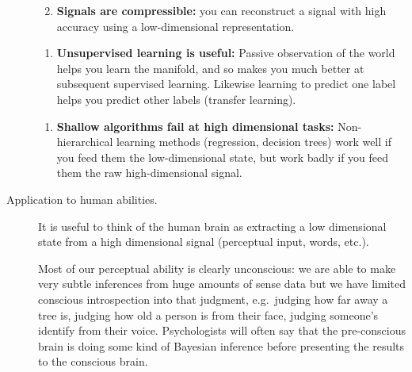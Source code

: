 \documentclass[
  10pt,
  letterpaper,
  DIV=11,
  numbers=noendperiod,
  oneside]{scrartcl}
\providecommand{\tightlist}{%
  \setlength{\itemsep}{0pt}\setlength{\parskip}{0pt}}\usepackage{longtable,booktabs,array}
\begin{document}
\begin{description}
\begin{enumerate}
\def\labelenumi{\arabic{enumi}.}
\setcounter{enumi}{1}
\tightlist
\item
  \textbf{Signals are compressible:} you can reconstruct a signal with
  high accuracy using a low-dimensional representation.
\end{enumerate}

\begin{enumerate}
\def\labelenumi{\arabic{enumi}.}
\setcounter{enumi}{2}
\tightlist
\item
  \textbf{Unsupervised learning is useful:} Passive observation of the
  world helps you learn the manifold, and so makes you much better at
  subsequent supervised learning. Likewise learning to predict one label
  helps you predict other labels (transfer learning).
\end{enumerate}

\begin{enumerate}
\def\labelenumi{\arabic{enumi}.}
\setcounter{enumi}{3}
\tightlist
\item
  \textbf{Shallow algorithms fail at high dimensional tasks:}
  Non-hierarchical learning methods (regression, decision trees) work
  well if you feed them the low-dimensional state, but work badly if you
  feed them the raw high-dimensional signal.
\end{enumerate}
\item[Application to human abilities.]
It is useful to think of the human brain as extracting a low dimensional
state from a high dimensional signal (perceptual input, words, etc.).

Most of our perceptual ability is clearly unconscious: we are able to
make very subtle inferences from huge amounts of sense data but we have
limited conscious introspection into that judgment, e.g.~judging how far
away a tree is, judging how old a person is from their face, judging
someone's identify from their voice. Psychologists will often say that
the pre-conscious brain is doing some kind of Bayesian inference before
presenting the results to the conscious brain.


\end{description}
\end{document}
